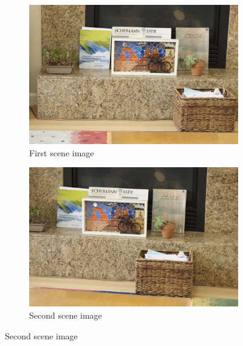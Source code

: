 \documentclass[a4paper]{article}
\begin{document}
\begin{figure}
    \centering
    \begin{subfigure}[b]{0.45\textwidth}
        \includegraphics[width=\textwidth]{../Scene/_DSF1768.JPG}
        \caption{First scene image}
        \label{fig:sn1}
    \end{subfigure}
    \begin{subfigure}[b]{0.45\textwidth}
        \includegraphics[width=\textwidth]{../Scene/_DSF1769.JPG}
        \caption{Second scene image}
        \label{fig:sn2}
    \end{subfigure}
\end{figure}

\FloatBarrier

\end{document}
